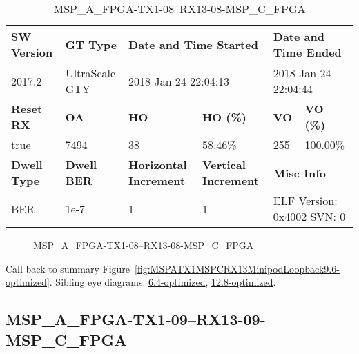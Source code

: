 \begin{table}[h]
\centering
\caption{MSP\_A\_FPGA-TX1-08--RX13-08-MSP\_C\_FPGA}
\label{tab:MSPAFPGATX108RX1308MSPCFPGA9.6-optimized}
\begin{tabular}{@{}|l|l|l|l|l|l|@{}}
\toprule
\textbf{SW Version}                & \textbf{GT Type}   & \multicolumn{2}{l|}{\textbf{Date and Time Started}}            & \multicolumn{2}{l|}{\textbf{Date and Time Ended}}        \\ \midrule
2017.2                       & UltraScale GTY          & \multicolumn{2}{l|}{2018-Jan-24 22:04:13}                   & \multicolumn{2}{l|}{2018-Jan-24 22:04:44}               \\ \midrule
\textbf{Reset RX}                  & \textbf{OA} & \textbf{HO}   & \textbf{HO (\%)} & \textbf{VO} & \textbf{VO (\%)} \\ \midrule
true & 7494        & 38          & 58.46\%        & 255        & 100.00\%       \\ \midrule
\textbf{Dwell Type}                & \textbf{Dwell BER} & \textbf{Horizontal Increment} & \textbf{Vertical Increment}    & \multicolumn{2}{l|}{\textbf{Misc Info}}                  \\ \midrule
BER                            & 1e-7        & 1        & 1           & \multicolumn{2}{l|}{ELF Version: 0x4002 SVN: 0}                         \\ \bottomrule
\end{tabular}
\end{table}

\begin{figure}[h]
\caption{MSP\_A\_FPGA-TX1-08--RX13-08-MSP\_C\_FPGA} \label{fig:MSPAFPGATX108RX1308MSPCFPGA9.6-optimized}
\end{figure}

Call back to summary Figure~\ref{fig:MSPATX1MSPCRX13MinipodLoopback9.6-optimized}.
Sibling eye diagrams: \hyperref[sec:MSPAFPGATX108RX1308MSPCFPGA6.4-optimized]{6.4-optimized}, \hyperref[sec:MSPAFPGATX108RX1308MSPCFPGA12.8-optimized]{12.8-optimized}.

\clearpage
\newpage


\subsection{MSP\_A\_FPGA-TX1-09--RX13-09-MSP\_C\_FPGA}\label{sec:MSPAFPGATX109RX1309MSPCFPGA9.6-optimized}

